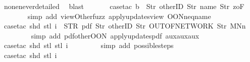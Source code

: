 \begin{isabellebody}
\ none{\isacharunderscore}never{\isacharunderscore}detailed\ \isamarkupfalse%
\ blast\isanewline
\isanewline
\ \ \ \ \ \isamarkupfalse%
\ {\isacharparenleft}case{\isacharunderscore}tac\ {\isachardoublequoteopen}b\ {\isacharequal}\ {\isacharbrackleft}Str\ {\isacharprime}{\isacharprime}otherID{\isacharprime}{\isacharprime}{\isacharcomma}\ Str\ {\isacharprime}{\isacharprime}name{\isacharprime}{\isacharprime}{\isacharcomma}\ Str\ {\isacharprime}{\isacharprime}{}zoF{\isacharprime}{\isacharprime}{\isacharbrackright}{\isachardoublequoteclose}{\isacharparenright}\isanewline
\ \ \ \ \ \ \isamarkupfalse%
\ {\isacharparenleft}simp\ add{\isacharcolon}\ viewOther{\isacharunderscore}fuzz\ apply{\isacharunderscore}updates{\isacharunderscore}view{}\ OON{\isacharunderscore}neq{\isacharunderscore}name{\isacharparenright}\isanewline
\ \ \ \ \ \ \isamarkupfalse%
\ {\isacharparenleft}case{\isacharunderscore}tac\ {\isachardoublequoteopen}shd\ {\isacharparenleft}stl\ i{\isacharparenright}\ {\isacharequal}\ {\isacharparenleft}STR\ {\isacharprime}{\isacharprime}pdf{\isacharprime}{\isacharprime}{\isacharcomma}\ {\isacharbrackleft}Str\ {\isacharprime}{\isacharprime}otherID{\isacharprime}{\isacharprime}{\isacharcomma}\ Str\ {\isacharprime}{\isacharprime}OUT{\isacharunderscore}OF{\isacharunderscore}NETWORK{\isacharprime}{\isacharprime}{\isacharcomma}\ Str\ {\isacharprime}{\isacharprime}MNn{}{\isacharprime}{\isacharprime}{\isacharbrackright}{\isacharparenright}{\isachardoublequoteclose}{\isacharparenright}\isanewline
\ \ \ \ \ \ \ \isamarkupfalse%
\ {\isacharparenleft}simp\ add{\isacharcolon}\ pdf{\isacharunderscore}other{\isacharunderscore}OON\ apply{\isacharunderscore}updates{\isacharunderscore}pdf{}\ aux{}{\isacharunderscore}aux{}{\isacharunderscore}aux{}{\isacharparenright}\isanewline
\ \ \ \ \ \ \ \isamarkupfalse%
\ {\isacharparenleft}case{\isacharunderscore}tac\ {\isachardoublequoteopen}shd\ {\isacharparenleft}stl\ {\isacharparenleft}stl\ i{\isacharparenright}{\isacharparenright}{\isachardoublequoteclose}{\isacharparenright}\isanewline
\ \ \ \ \ \ \ \isamarkupfalse%
\ {\isacharparenleft}simp\ add{\isacharcolon}\ possible{\isacharunderscore}steps{\isacharunderscore}{}{\isacharparenright}\isanewline
\isanewline
\ \ \ \ \ \ \isamarkupfalse%
\ {\isacharparenleft}case{\isacharunderscore}tac\ {\isachardoublequoteopen}shd\ {\isacharparenleft}stl\ i{\isacharparenright}{\isachardoublequoteclose}{\isacharparenright}\isanewline

\end{isabellebody}

